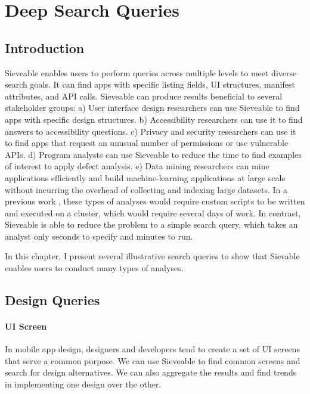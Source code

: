 \chapter{Deep Search Queries}
\label{ch:findings_chapter}

\section{Introduction}
Sieveable enables users to perform queries across multiple levels to meet diverse search goals.
It can find apps with specific listing fields, UI structures, manifest attributes, and API calls.
Sieveable can produce results beneficial to several stakeholder groups:
a) User interface design researchers can use Sieveable to find apps with specific design structures.
b) Accessibility researchers can use it to find answers to accessibility questions.
c) Privacy and security researchers can use it to find apps that request an unusual number of permissions or use vulnerable APIs.
d) Program analysts can use Sieveable to reduce the time to find examples of interest to apply defect analysis.
e) Data mining researchers can mine applications efficiently and build machine-learning applications at large scale without incurring the overhead of collecting and indexing large datasets.
In a previous work \cite{Alharbi_2015_MobileHCI}, these types of analyses would require custom scripts to be written and executed on a cluster, which would require several days of work.
In contrast, Sieveable is able to reduce the problem to a simple search query, which takes an analyst only seconds to specify and minutes to run.

In this chapter, I present several illustrative search queries to show that Sievable enables users to conduct many types of analyses.

\section{Design Queries}
\subsubsection{UI Screen}
In mobile app design, designers and developers tend to create a set of UI screens that serve a common purpose. 
We can use Sieveable to find common screens and search for design alternatives.
We can also aggregate the results and find trends in implementing one design over the other.

